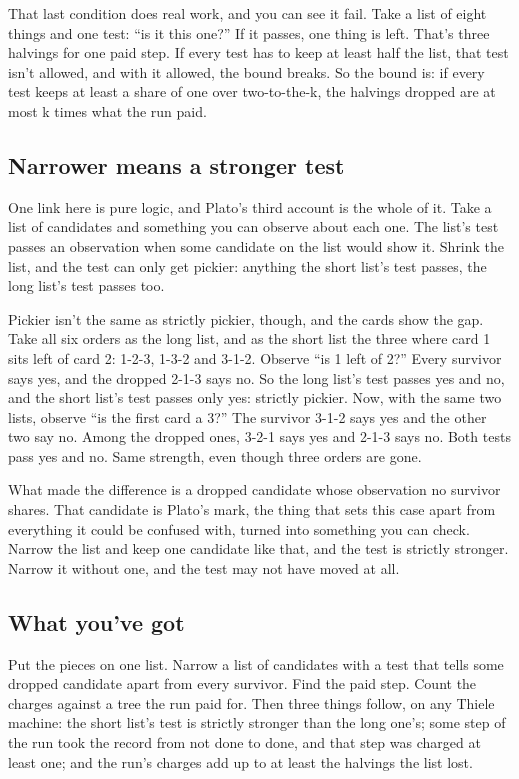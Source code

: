 \documentclass[11pt,twoside]{article}
\theoremstyle{thielethm}
\theoremstyle{thieledef}
\theoremstyle{thieledef}
\theoremstyle{thieledef}
\theoremstyle{thielethm}
\theoremstyle{thieleobs}
\theoremstyle{thielethm}
\begin{document}
That last condition does real work, and you can see it fail. Take a list of eight things and one test: ``is it this one?'' If it passes, one thing is left. That's three halvings for one paid step. If every test has to keep at least half the list, that test isn't allowed, and with it allowed, the bound breaks. So the bound is: if every test keeps at least a share of one over two-to-the-k, the halvings dropped are at most k times what the run paid.

\subsection{Narrower means a stronger test}

One link here is pure logic, and Plato's third account is the whole of it. Take a list of candidates and something you can observe about each one. The list's test passes an observation when some candidate on the list would show it. Shrink the list, and the test can only get pickier: anything the short list's test passes, the long list's test passes too.

Pickier isn't the same as strictly pickier, though, and the cards show the gap. Take all six orders as the long list, and as the short list the three where card 1 sits left of card 2: 1-2-3, 1-3-2 and 3-1-2. Observe ``is 1 left of 2?'' Every survivor says yes, and the dropped 2-1-3 says no. So the long list's test passes yes and no, and the short list's test passes only yes: strictly pickier. Now, with the same two lists, observe ``is the first card a 3?'' The survivor 3-1-2 says yes and the other two say no. Among the dropped ones, 3-2-1 says yes and 2-1-3 says no. Both tests pass yes and no. Same strength, even though three orders are gone.

What made the difference is a dropped candidate whose observation no survivor shares. That candidate is Plato's mark, the thing that sets this case apart from everything it could be confused with, turned into something you can check. Narrow the list and keep one candidate like that, and the test is strictly stronger. Narrow it without one, and the test may not have moved at all.

\subsection{What you've got}

Put the pieces on one list. Narrow a list of candidates with a test that tells some dropped candidate apart from every survivor. Find the paid step. Count the charges against a tree the run paid for. Then three things follow, on any Thiele machine: the short list's test is strictly stronger than the long one's; some step of the run took the record from not done to done, and that step was charged at least one; and the run's charges add up to at least the halvings the list lost.
\end{document}
